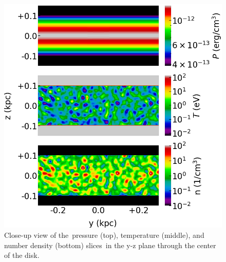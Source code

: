 \documentclass[twocolumn]{aastex631}
\begin{document}
  \begin{figure}
    \includegraphics[width=\columnwidth]{figures/fig__zoom-in-disk.png}
    \caption{Close-up view of the\
             pressure (top), temperature (middle), and number density (bottom) slices\
             in the y-z plane through the center of the disk.
             }
    \label{fig__zoom-in-disk}
  \end{figure}
\end{document}

